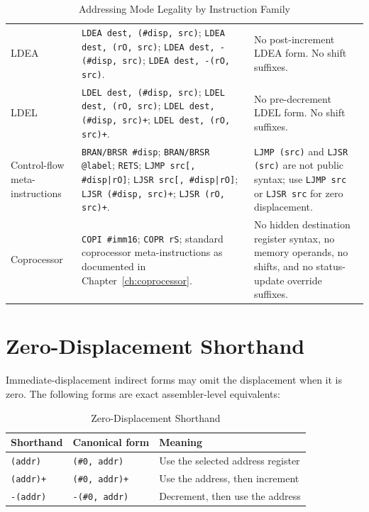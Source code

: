 \begin{table}[H]
\begin{tabularx}{\textwidth}{>{\raggedright\arraybackslash}p{2.2cm}>{\raggedright\arraybackslash}X>{\raggedright\arraybackslash}X}
		LDEA                           & \texttt{LDEA dest, (\#disp, src)}; \texttt{LDEA dest, (rO, src)}; \texttt{LDEA dest, -(\#disp, src)}; \texttt{LDEA dest, -(rO, src)}.                                                              & No post-increment LDEA form. No shift suffixes.                                                                                      \\
		LDEL                           & \texttt{LDEL dest, (\#disp, src)}; \texttt{LDEL dest, (rO, src)}; \texttt{LDEL dest, (\#disp, src)+}; \texttt{LDEL dest, (rO, src)+}.                                                              & No pre-decrement LDEL form. No shift suffixes.                                                                                       \\
		Control-flow meta-instructions & \texttt{BRAN/BRSR \#disp}; \texttt{BRAN/BRSR @label}; \texttt{RETS}; \texttt{LJMP src[, \#disp|rO]}; \texttt{LJSR src[, \#disp|rO]}; \texttt{LJSR (\#disp, src)+}; \texttt{LJSR (rO, src)+}.       & \texttt{LJMP (src)} and \texttt{LJSR (src)} are not public syntax; use \texttt{LJMP src} or \texttt{LJSR src} for zero displacement. \\
		Coprocessor                    & \texttt{COPI \#imm16}; \texttt{COPR rS}; standard coprocessor meta-instructions as documented in Chapter~\ref{ch:coprocessor}.                                                                     & No hidden destination register syntax, no memory operands, no shifts, and no status-update override suffixes.                        \\
		\bottomrule
	\end{tabularx}
	\caption{Addressing Mode Legality by Instruction Family}
	\label{tab:legal-modes-by-family}
\end{table}

\section{Zero-Displacement Shorthand}

Immediate-displacement indirect forms may omit the displacement when it is zero. The following forms are exact
assembler-level equivalents:

\begin{table}[H]
	\centering
	\begin{tabular}{lll}
		\toprule
		\textbf{Shorthand} & \textbf{Canonical form} & \textbf{Meaning}                  \\
		\midrule
		\texttt{(addr)}    & \texttt{(\#0, addr)}    & Use the selected address register \\
		\texttt{(addr)+}   & \texttt{(\#0, addr)+}   & Use the address, then increment   \\
		\texttt{-(addr)}   & \texttt{-(\#0, addr)}   & Decrement, then use the address   \\
		\bottomrule
	\end{tabular}
	\caption{Zero-Displacement Shorthand}
	\label{tab:zero-displacement-shorthand}
\end{table}

